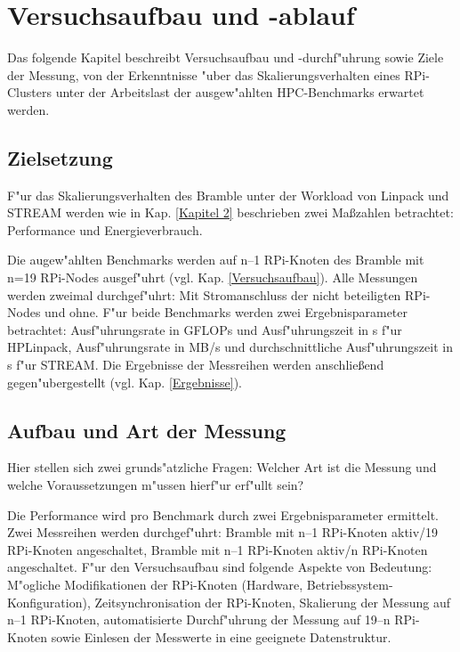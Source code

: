 \chapter{Versuchsaufbau und -ablauf}\label{Kap3}

Das folgende Kapitel beschreibt Versuchsaufbau und -durchf"uhrung sowie Ziele der Messung, von der Erkenntnisse "uber das Skalierungsverhalten eines RPi-Clusters unter der Arbeitslast der ausgew"ahlten HPC-Benchmarks erwartet werden. 

\section{Zielsetzung}\label{Ziel}

F"ur das Skalierungsverhalten des Bramble unter der Workload von Linpack und STREAM werden wie in Kap. \ref{Kapitel 2} beschrieben zwei Ma\ss zahlen betrachtet: Performance und Energieverbrauch.

Die augew"ahlten Benchmarks werden auf n--1 RPi-Knoten des Bramble mit n=19 RPi-Nodes ausgef"uhrt (vgl. Kap. \ref{Versuchsaufbau}). Alle Messungen werden zweimal durchgef"uhrt: Mit Stromanschluss der nicht beteiligten RPi-Nodes und ohne. F"ur beide Benchmarks werden zwei Ergebnisparameter betrachtet: Ausf"uhrungsrate in GFLOPs und Ausf"uhrungszeit in s f"ur HPLinpack, Ausf"uhrungsrate in MB/s und durchschnittliche Ausf"uhrungszeit in s f"ur STREAM. Die Ergebnisse der Messreihen werden anschlie\ss end gegen"ubergestellt (vgl. Kap. \ref{Ergebnisse}). 

\section{Aufbau und Art der Messung}\label{Aufbau}

Hier stellen sich zwei grunds"atzliche Fragen: Welcher Art ist die Messung und welche Voraussetzungen m"ussen hierf"ur erf"ullt sein? 

Die Performance wird pro Benchmark durch zwei Ergebnisparameter ermittelt. Zwei Messreihen werden durchgef"uhrt: Bramble mit n--1 RPi-Knoten aktiv/19 RPi-Knoten angeschaltet, Bramble mit n--1 RPi-Knoten aktiv/n RPi-Knoten angeschaltet. 
F"ur den Versuchsaufbau sind folgende Aspekte von Bedeutung: M"ogliche Modifikationen der RPi-Knoten (Hardware, Betriebssystem-Konfiguration), Zeitsynchronisation der RPi-Knoten, Skalierung der Messung auf n--1 RPi-Knoten, automatisierte Durchf"uhrung der Messung auf 19--n RPi-Knoten sowie Einlesen der Messwerte in eine geeignete Datenstruktur. 

